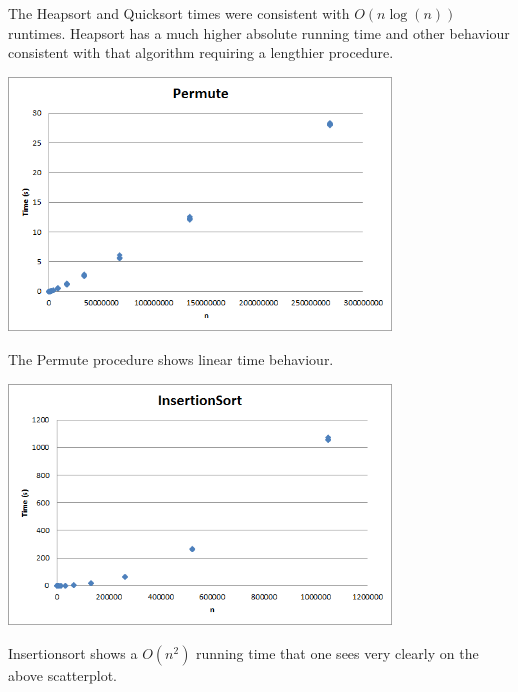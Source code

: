    The Heapsort and Quicksort times were consistent with $O(n\log(n))$
   runtimes. Heapsort has a much higher absolute running time and other
   behaviour consistent with that algorithm requiring a lengthier procedure.
   
   \begin{center}
    \includegraphics[width=4in]{permute.png}
   \end{center}
   
   The Permute procedure shows linear time behaviour.
   
   \begin{center}
    \includegraphics[width=4in]{insertionsort.png}
   \end{center}
   
   Insertionsort shows a $O(n^2)$ running time that one sees very clearly on
   the above scatterplot.